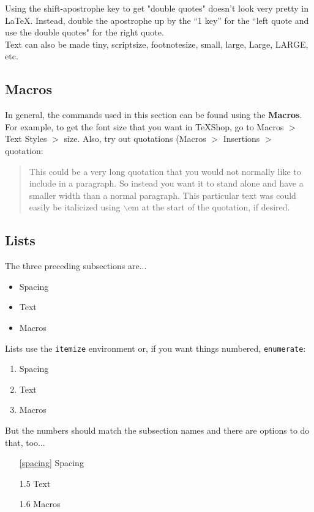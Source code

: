 \documentclass[11pt]{article} %
\begin{document}
Using the shift-apostrophe key to get "double quotes" doesn't look very pretty in LaTeX. Instead, double the apostrophe up by the ``1 key'' for the ``left quote and use the double quotes" for the right quote. \\

Text can also be made {\tiny tiny}, {\scriptsize scriptsize}, {\footnotesize footnotesize}, {\small small}, {\large large}, {\Large Large}, {\LARGE LARGE}, etc. \\

\subsection{Macros}

In general, the commands used in this section can be found using the \textbf{Macros}. For example, to get the font size that you want in TeXShop, go to Macros $>$ Text Styles $>$ size. Also, try out quotations (Macros $>$ Insertions $>$ quotation:
\begin{quotation} %
This could be a very long quotation that you would not normally like to include in a paragraph. So instead you want it to stand alone and have a smaller width than a normal paragraph. This particular text was could easily be italicized using $\backslash$em at the start of the quotation, if desired.
\end{quotation}

\subsection{Lists}

The three preceding subsections are...
\begin{itemize}
\item Spacing
\item Text
\item Macros
\end{itemize}
Lists use the \texttt{itemize} environment or, if you want things numbered, \texttt{enumerate}:
\begin{enumerate}
\item Spacing
\item Text
\item Macros
\end{enumerate}
But the numbers should match the subsection names and there are options to do that, too...
\begin{enumerate}
\item[\ref{spacing}] Spacing %
\item[1.5] Text
\item[1.6] Macros
\end{enumerate}
\end{document}
